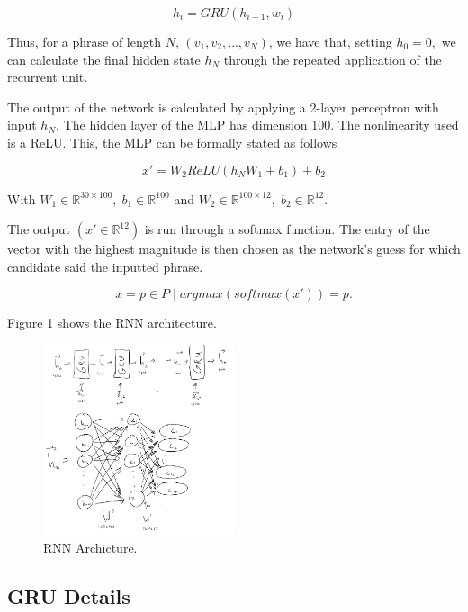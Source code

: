 \documentclass{article}
\begin{document}
\begin{equation}h_i = GRU(h_{i-1}, w_i)\end{equation}

 Thus, for a phrase of length $N$, $(v_1,v_2,\dots,v_N)$, we have that, setting $h_0 = 0,$ we can calculate the final hidden state $h_N$ through the repeated application of the recurrent unit. 
 
 The output of the network is calculated by applying a 2-layer perceptron with input $h_N$. The hidden layer of the MLP has dimension 100. The nonlinearity used is a ReLU. This, the MLP can be formally stated as follows
 
 \begin{equation}x' = W_2 ReLU(h_N W_1 + b_1) + b_2\end{equation}
 \begin{center} With $W_1 \in \mathbb{R}^{30 \times 100}, \; b_1 \in \mathbb{R}^{100}$ and $W_2 \in \mathbb{R}^{100 \times 12}, \; b_2 \in \mathbb{R}^{12}.$ \end{center}
 
 The output $(x' \in \mathbb{R}^{12})$ is run through a softmax function. The entry of the vector with the highest magnitude is then chosen as the network’s guess for which candidate said the inputted phrase. 


\begin{equation} x = p \in P \; | \; argmax(softmax(x'))= p. \end{equation}

Figure 1 shows the RNN architecture.

\begin{figure}[h]
\caption{RNN Archicture.}
\centering
\includegraphics[width=0.5\textwidth]{RNN.png}
\end{figure}

\subsection{GRU Details}
\end{document}
